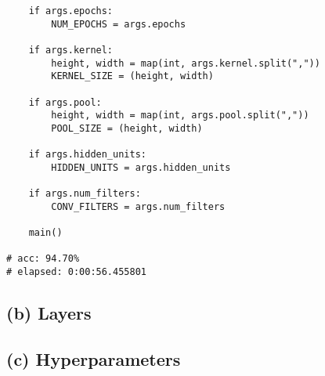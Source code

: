 \documentclass{article}[11pt]
\begin{document}
\begin{verbatim}
    if args.epochs:
        NUM_EPOCHS = args.epochs
    
    if args.kernel:
        height, width = map(int, args.kernel.split(","))
        KERNEL_SIZE = (height, width)

    if args.pool:
        height, width = map(int, args.pool.split(","))
        POOL_SIZE = (height, width)
    
    if args.hidden_units:
        HIDDEN_UNITS = args.hidden_units
    
    if args.num_filters:
        CONV_FILTERS = args.num_filters

    main()

# acc: 94.70%
# elapsed: 0:00:56.455801
\end{verbatim}

\subsection*{(b) Layers}


\subsection*{(c) Hyperparameters}
\end{document}
